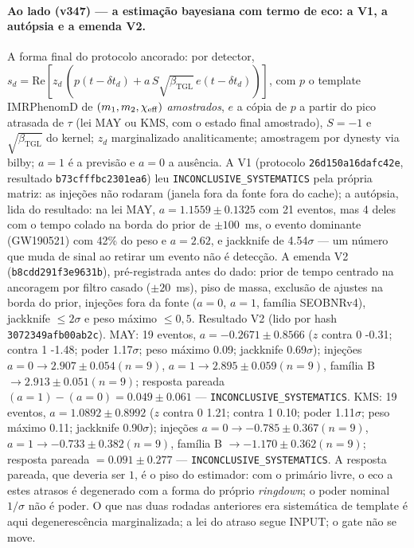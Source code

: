 \documentclass[11pt]{article}
\newcommand{\bTGL}{\beta_{\mathrm{TGL}}}\newcommand{\Msun}{M_{\odot}}\newcommand{\TGL}{\mathrm{TGL}}
\theoremstyle{definition}\newtheorem{deriv}{Derivação}
\begin{document}
\paragraph*{Ao lado (v347) --- a estimação bayesiana com termo de eco: a V1, a autópsia e a emenda V2.} A forma final do protocolo ancorado: por detector, $s_d=\mathrm{Re}[z_d\,(p(t-\delta t_d)+a\,S\sqrt{\bTGL}\,e(t-\delta t_d))]$, com $p$ o template IMRPhenomD de $(m_1,m_2,\chi_{\rm eff})$ \emph{amostrados}, $e$ a cópia de $p$ a partir do pico atrasada de $\tau$ (lei MAY ou KMS, com o estado final amostrado), $S=-1$ e $\sqrt{\bTGL}$ do kernel; $z_d$ marginalizado analiticamente; amostragem por dynesty via bilby; $a=1$ é a previsão e $a=0$ a ausência. A V1 (protocolo \texttt{26d150a16dafc42e}, resultado \texttt{b73cfffbc2301ea6}) leu \texttt{INCONCLUSIVE\_SYSTEMATICS} pela própria matriz: as injeções não rodaram (janela fora da fonte fora do cache); a autópsia, lida do resultado: na lei MAY, $a=1.1559\pm0.1325$ com 21 eventos, mas 4 deles com o tempo colado na borda do prior de $\pm100$~ms, o evento dominante (GW190521) com 42\% do peso e $a=2.62$, e jackknife de 4.54$\sigma$ --- um número que muda de sinal ao retirar um evento não é detecção. A emenda V2 (\texttt{b8cdd291f3e9631b}), pré-registrada antes do dado: prior de tempo centrado na ancoragem por filtro casado ($\pm20$~ms), piso de massa, exclusão de ajustes na borda do prior, injeções fora da fonte ($a=0$, $a=1$, família SEOBNRv4), jackknife $\le2\sigma$ e peso máximo $\le0{,}5$. Resultado V2 (lido por hash \texttt{3072349afb00ab2c}). MAY: 19 eventos, $a=-0.2671\pm0.8566$ ($z$ contra 0 -0.31; contra 1 -1.48; poder 1.17$\sigma$; peso máximo 0.09; jackknife 0.69$\sigma$); injeções $a{=}0\to2.907\pm0.054 (n=9)$, $a{=}1\to2.895\pm0.059 (n=9)$, família B $\to2.913\pm0.051 (n=9)$; resposta pareada $(a{=}1)-(a{=}0)=0.049\pm0.061$ --- \texttt{INCONCLUSIVE\_SYSTEMATICS}. KMS: 19 eventos, $a=1.0892\pm0.8992$ ($z$ contra 0 1.21; contra 1 0.10; poder 1.11$\sigma$; peso máximo 0.11; jackknife 0.90$\sigma$); injeções $a{=}0\to-0.785\pm0.367 (n=9)$, $a{=}1\to-0.733\pm0.382 (n=9)$, família B $\to-1.170\pm0.362 (n=9)$; resposta pareada $=0.091\pm0.277$ --- \texttt{INCONCLUSIVE\_SYSTEMATICS}. A resposta pareada, que deveria ser $1$, é o piso do estimador: com o primário livre, o eco a estes atrasos é degenerado com a forma do próprio \emph{ringdown}; o poder nominal $1/\sigma$ não é poder. O que nas duas rodadas anteriores era sistemática de template é aqui degenerescência marginalizada; a lei do atraso segue INPUT; o gate não se move.
\end{document}
